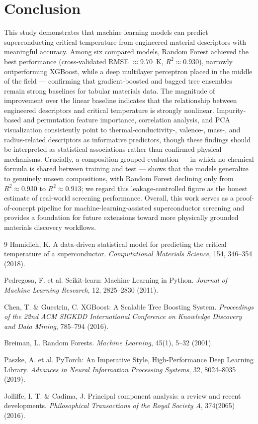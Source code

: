 \documentclass[11pt]{article}
\begin{document}
\section{Conclusion}
This study demonstrates that machine learning models can predict superconducting critical temperature from
engineered material descriptors with meaningful accuracy. Among six compared models, Random Forest achieved
the best performance (cross-validated RMSE $\approx 9.70$~K, $R^2 \approx 0.930$), narrowly outperforming
XGBoost, while a deep multilayer perceptron placed in the middle of the field --- confirming that
gradient-boosted and bagged tree ensembles remain strong baselines for tabular materials data. The
magnitude of improvement over the linear baseline indicates that the relationship between engineered
descriptors and critical temperature is strongly nonlinear. Impurity-based and permutation feature
importance, correlation analysis, and PCA visualization consistently point to thermal-conductivity-,
valence-, mass-, and radius-related descriptors as informative predictors, though these findings should be
interpreted as statistical associations rather than confirmed physical mechanisms. Crucially, a
composition-grouped evaluation --- in which no chemical formula is shared between training and test ---
shows that the models generalize to genuinely unseen compositions, with Random Forest declining only from
$R^2 \approx 0.930$ to $R^2 \approx 0.913$; we regard this leakage-controlled figure as the honest estimate
of real-world screening performance. Overall,
this work serves as a proof-of-concept pipeline for machine-learning-assisted superconductor screening and
provides a foundation for future extensions toward more physically grounded materials discovery workflows.

\begin{thebibliography}{9}
Hamidieh, K. A data-driven statistical model for predicting the critical temperature of a superconductor.
\textit{Computational Materials Science}, 154, 346--354 (2018).

Pedregosa, F. et al. Scikit-learn: Machine Learning in Python.
\textit{Journal of Machine Learning Research}, 12, 2825--2830 (2011).

Chen, T. \& Guestrin, C. XGBoost: A Scalable Tree Boosting System.
\textit{Proceedings of the 22nd ACM SIGKDD International Conference on Knowledge Discovery and Data Mining},
785--794 (2016).

Breiman, L. Random Forests. \textit{Machine Learning}, 45(1), 5--32 (2001).

Paszke, A. et al. PyTorch: An Imperative Style, High-Performance Deep Learning Library.
\textit{Advances in Neural Information Processing Systems}, 32, 8024--8035 (2019).

Jolliffe, I. T. \& Cadima, J. Principal component analysis: a review and recent developments.
\textit{Philosophical Transactions of the Royal Society A}, 374(2065) (2016).
\end{thebibliography}
\end{document}
